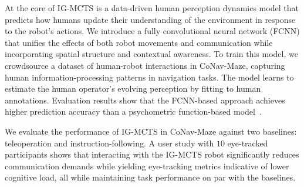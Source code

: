 At the core of IG-MCTS is a data-driven human perception dynamics model that predicts how humans update their understanding of the environment in response to the robot’s actions. We introduce a fully convolutional neural network (FCNN) that unifies the effects of both robot movements and communication while incorporating spatial structure and contextual awareness.
To train this model, we crowdsource a dataset of human-robot interactions in CoNav-Maze, capturing human information-processing patterns in navigation tasks. The model learns to estimate the human operator’s evolving perception by fitting to human annotations. Evaluation results show that the FCNN-based approach achieves higher prediction accuracy than a psychometric function-based model~\cite{treutwein1999fitting}.

We evaluate the performance of IG-MCTS in CoNav-Maze against two baselines: teleoperation and instruction-following. 
A user study with $10$ eye-tracked participants shows that interacting with the IG-MCTS robot significantly reduces communication demands while yielding eye-tracking metrics indicative of lower cognitive load, all while maintaining task performance on par with the baselines.
